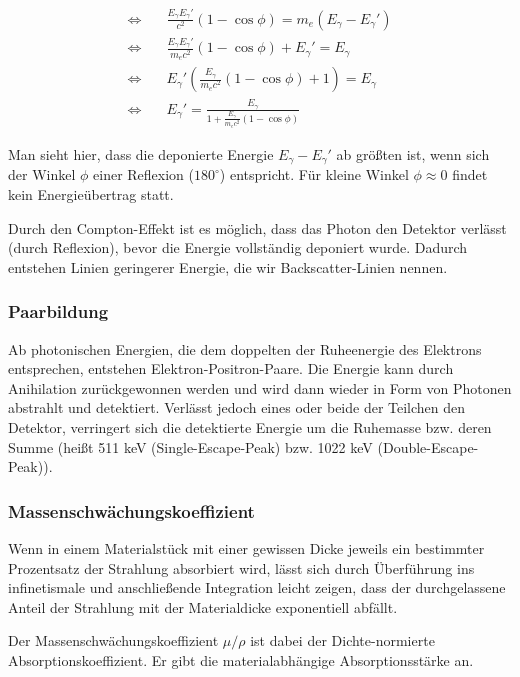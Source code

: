 \documentclass[a4paper,german,12pt,smallheadings]{scrartcl}
\begin{document}
\begin{align}
  \Leftrightarrow\quad&\frac{E_\gamma E_\gamma'}{c^2}(1 - \cos \phi) = m_e(E_\gamma - E_\gamma') \\
  \Leftrightarrow\quad&\frac{E_\gamma E_\gamma'}{m_e c^2}(1 - \cos \phi) + E_\gamma' = E_\gamma \\
  \Leftrightarrow\quad&E_\gamma' \left(\frac{E_\gamma}{m_e c^2}(1 - \cos \phi) + 1\right) = E_\gamma \\
  \Leftrightarrow\quad&E_\gamma' = \frac{E_\gamma}{1 + \frac{E_\gamma}{m_e c^2}(1 - \cos \phi)}
\end{align}

Man sieht hier, dass die deponierte Energie $E_\gamma - E_\gamma'$ ab größten
ist, wenn sich der Winkel $\phi$ einer Reflexion ($180^\circ$) entspricht. Für
kleine Winkel $\phi \approx 0$ findet kein Energieübertrag statt.

Durch den Compton-Effekt ist es möglich, dass das Photon den Detektor verlässt
(durch Reflexion), bevor die Energie vollständig deponiert wurde. Dadurch
entstehen Linien geringerer Energie, die wir Backscatter-Linien nennen.

\subsubsection{Paarbildung}

Ab photonischen Energien, die dem doppelten der Ruheenergie des Elektrons
entsprechen, entstehen Elektron-Positron-Paare. Die Energie kann durch
Anihilation zurückgewonnen werden und wird dann wieder in Form von Photonen
abstrahlt und detektiert. Verlässt jedoch eines oder beide der Teilchen den
Detektor, verringert sich die detektierte Energie um die Ruhemasse bzw. deren
Summe (heißt 511 keV (Single-Escape-Peak) bzw. 1022 keV (Double-Escape-Peak)).

\subsubsection{Massenschwächungskoeffizient}

Wenn in einem Materialstück mit einer gewissen Dicke jeweils ein bestimmter
Prozentsatz der Strahlung absorbiert wird, lässt sich durch Überführung ins
infinetismale und anschließende Integration leicht zeigen, dass der
durchgelassene Anteil der Strahlung mit der Materialdicke exponentiell abfällt.

Der Massenschwächungskoeffizient $\mu/\rho$ ist dabei der Dichte-normierte
Absorptionskoeffizient. Er gibt die materialabhängige Absorptionsstärke an.
\end{document}
